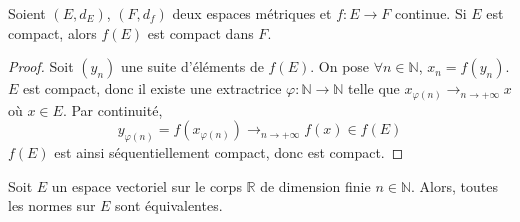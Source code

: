  \begin{proposition}
    \label{equivalence-des-normes-en-dimension-finie-et-theoreme-de-riesz-2}
    Soient $(E,d_E)$, $(F,d_f)$ deux espaces métriques et $f : E \rightarrow F$ continue. Si $E$ est compact, alors $f(E)$ est compact dans $F$.
  \end{proposition}

  \begin{proof}
    Soit $(y_n)$ une suite d'éléments de $f(E)$. On pose $\forall n \in \mathbb{N}$, $x_n = f(y_n)$. $E$ est compact, donc il existe une extractrice $\varphi : \mathbb{N} \rightarrow \mathbb{N}$ telle que $x_{\varphi(n)} \longrightarrow_{n \rightarrow +\infty} x$ où $x \in E$. Par continuité,
    \[ y_{\varphi(n)} = f(x_{\varphi(n)}) \longrightarrow_{n \rightarrow +\infty} f(x) \in f(E) \]
    $f(E)$ est ainsi séquentiellement compact, donc est compact.
  \end{proof}

  \begin{theorem}
    Soit $E$ un espace vectoriel sur le corps $\mathbb{R}$ de dimension finie $n \in \mathbb{N}$. Alors, toutes les normes sur $E$ sont équivalentes.
  \end{theorem}

